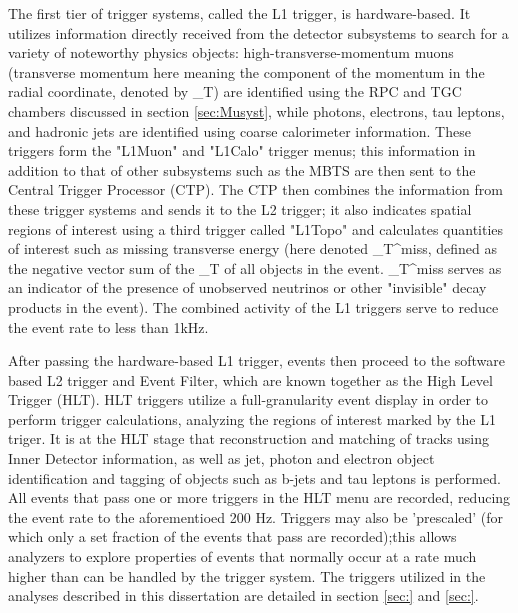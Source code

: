 The first tier of trigger systems, called the L1 trigger, is hardware-based. It utilizes information directly received from the detector subsystems to search for a variety of noteworthy physics objects: high-transverse-momentum muons (transverse momentum here meaning the component of the momentum in the radial coordinate, denoted by \p_T) are identified using the RPC and TGC chambers discussed in section \ref{sec:Musyst}, while photons, electrons, tau leptons, and hadronic jets are identified using coarse calorimeter information. These triggers form the "L1Muon" and "L1Calo" trigger menus; this information in addition to that of other subsystems such as the MBTS are then sent to the Central Trigger Processor (CTP). The CTP then combines the information from these trigger systems and sends it to the L2 trigger; it also indicates spatial regions of interest using a third trigger called "L1Topo" and calculates quantities of interest such as missing transverse energy (here denoted \E_T^miss, defined as the negative vector sum of the \p_T of all objects in the event. \E_T^miss serves as an indicator of the presence of unobserved neutrinos or other "invisible" decay products in the event). The combined activity of the L1 triggers serve to reduce the event rate to less than 1kHz.

After passing the hardware-based L1 trigger, events then proceed to the software based L2 trigger and Event Filter, which are known together as the High Level Trigger (HLT). HLT triggers utilize a full-granularity event display in order to perform trigger calculations, analyzing the regions of interest marked by the L1 triger. It is at the HLT stage that reconstruction and matching of tracks using Inner Detector information, as well as jet, photon and electron object identification and tagging of objects such as b-jets and tau leptons is performed. All events that pass one or more triggers in the HLT menu are recorded, reducing the event rate to the aforementioed 200 Hz. Triggers may also be 'prescaled' (for which only a set fraction of the events that pass are recorded);this allows analyzers to explore properties of events that normally occur at a rate much higher than can be handled by the trigger system. The triggers utilized in the analyses described in this dissertation are detailed in section \ref{sec:} and \ref{sec:}.

